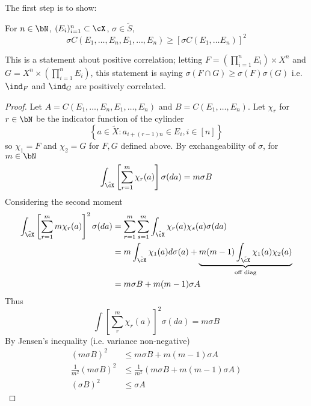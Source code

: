 The first step is to show:
\begin{theorem}
  \label{thm:positive-corr-cylinders}
  For $n \in \bN$, $(E_i)_{i=1}^n \subset \cX$, $\sigma \in \tilde{S}$,
  \[
    \sigma C(E_1, \ldots, E_n, E_1, \ldots, E_n)
    \geq [\sigma C(E_1, \ldots E_n)]^2
  \]
\end{theorem}
This is a statement about positive correlation; letting
$F = \left(\prod_{i=1}^n E_i \right) \times X^n$
and $G = X^n \times \left(\prod_{i=1}^n E_i \right)$,
this statement is saying $\sigma(F \cap G) \geq \sigma(F) \sigma(G)$
i.e. $\ind_{F}$ and $\ind_{G}$ are positively correlated.
\begin{proof}
  Let $A = C(E_1, \ldots, E_n, E_1, \ldots, E_n)$
  and $B = C(E_1, \ldots, E_n)$.
  Let $\chi_r$ for $r \in \bN$ be the indicator function of the cylinder
  \[
    \left\{
      a \in \tilde{X} : a_{i + (r-1)n} \in E_i, i \in [n]
    \right\}
  \]
  so $\chi_1 = F$ and $\chi_2 = G$ for $F,G$ defined above.
  By exchangeability of $\sigma$, for $m \in \bN$
  \[
    \int_{\tilde{\cX}} \left[ \sum_{r=1}^m \chi_r(a) \right] \sigma(da) = m \sigma B
  \]
  Considering the second moment
  \begin{align*}
    \int_{\tilde{\cX}} \left[ \sum_{r=1}^m m\chi_r(a) \right]^2 \sigma(da)
    &= \sum_{r=1}^m \sum_{s=1}^m \int_{\tilde{\cX}} \chi_r(a) \chi_s(a) \sigma(da) \\
    &= m \int_{\tilde{\cX}} \chi_1(a) d\sigma(a) + \underbrace{m (m-1) \int_{\tilde{\cX}} \chi_1(a) \chi_2(a)}_{\text{off diag}} \\
    &= m \sigma B + m (m-1) \sigma A
  \end{align*}
  Thus
  \[
  \int \left[ \sum_r^m \chi_r(a) \right]^2 \sigma(da) = m \sigma B
  \]
  By Jensen's inequality (i.e. variance non-negative) 
  \begin{align*}
    (m \sigma B)^2 &\leq m \sigma B + m (m-1) \sigma A \\
    \frac{1}{m^2} (m \sigma B)^2 &\leq \frac{1}{m^2} \left(m \sigma B + m (m-1) \sigma A\right) \\
    (\sigma B)^2 &\leq \sigma A
  \end{align*}
\end{proof}
